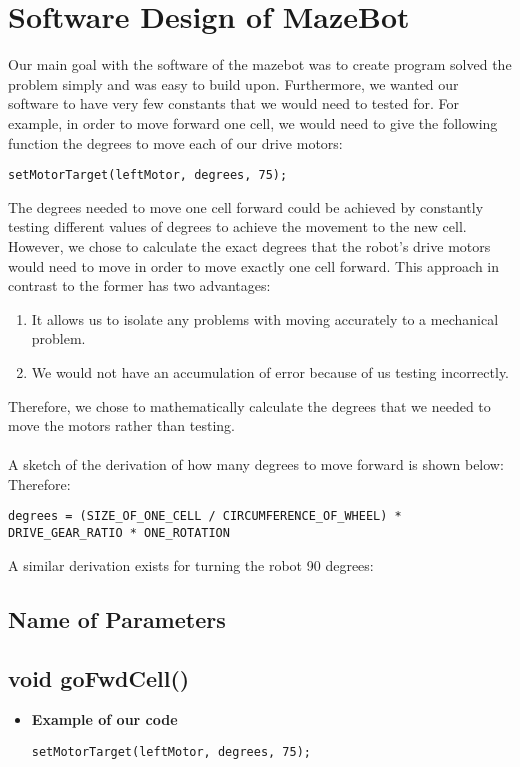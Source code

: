 \documentclass[11pt]{article}
\begin{document}
\section{Software Design of MazeBot}
Our main goal with the software of the mazebot was to create program solved the problem simply and was easy to build upon. Furthermore, we wanted our software to have very few constants that we would need to tested for. For example, in order to move forward one cell, we would need to give the following function the degrees to move each of our drive motors:
\begin{verbatim}
setMotorTarget(leftMotor, degrees, 75);
\end{verbatim}
The degrees needed to move one cell forward could be achieved by constantly testing different values of degrees to achieve the movement to the new cell. However, we chose to calculate the exact degrees that the robot's drive motors would need to move in order to move exactly one cell forward. This approach in contrast to the former has two advantages: 
\begin{enumerate}
\item It allows us to isolate any problems with moving accurately to a mechanical problem.
\item We would not have an accumulation of error because of us testing incorrectly.
\end{enumerate}
Therefore, we chose to mathematically calculate the degrees that we needed to move the motors rather than testing.\\\\
A sketch of the derivation of how many degrees to move forward is shown below: %
\\
Therefore:
\begin{verbatim}
degrees = (SIZE_OF_ONE_CELL / CIRCUMFERENCE_OF_WHEEL) * DRIVE_GEAR_RATIO * ONE_ROTATION
\end{verbatim}
A similar derivation exists for turning the robot 90 degrees: %

\subsection{Name of Parameters}


\subsection{void goFwdCell()}
\begin{itemize}
\item \textbf{Example of our code}
\begin{verbatim}
setMotorTarget(leftMotor, degrees, 75);
\end{verbatim}
\end{itemize}
\end{document}
